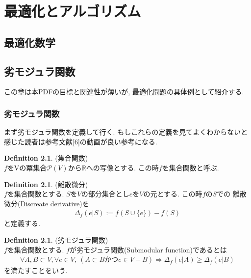 \documentclass[11pt, a4paper, dvipdfmx]{jsbook}
\theoremstyle{definition}
\newtheorem{Definition+}[Axiom+]{Definition}
\newcommand{\R}{\mathbb{R}}
\begin{document}
\part{最適化とアルゴリズム}
\chapter{最適化数学}
\chapter{劣モジュラ関数}
この章は本PDFの目標と関連性が薄いが, 最適化問題の具体例として紹介する. 
\section{劣モジュラ関数}
まず劣モジュラ関数を定義して行く. もしこれらの定義を見てよくわからないと感じた読者は参考文献[6]の動画が良い参考になる.
\begin{Definition+}(集合関数)\\
   $f$をVの冪集合$\mathcal{P}(V)$から$\R$への写像とする. この時$f$を集合関数と呼ぶ.
\end{Definition+}
\begin{Definition+}(離散微分)\\
    $f$を集合関数とする. $S$を$V$の部分集合とし$e$を$V$の元とする. この時$f$の$S$での
    離散微分(Discreate derivative)を
    \begin{align*}
        \Delta_{f}(e | S) := f(S\cup\{e\}) - f(S)
    \end{align*}
    と定義する.
\end{Definition+}
\begin{Definition+}(劣モジュラ関数)\\
    $f$を集合関数とする. $f$が劣モジュラ関数(Submodular function)であるとは
    \begin{align*}
        \forall A, B\subset V, \forall e\in V, ~(A\subset B かつe\in V - B)\Longrightarrow \Delta_{f}(e | A)\geq\Delta_{f}(e | B)
    \end{align*}
    を満たすことをいう.
\end{Definition+}
\end{document}
